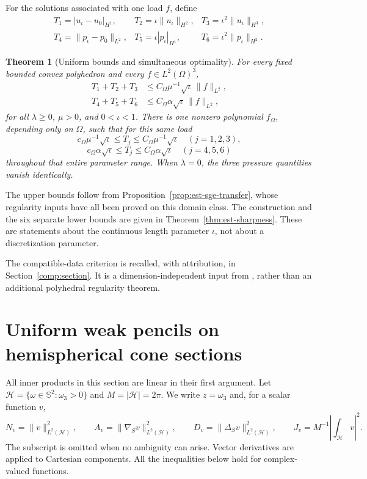 \documentclass[11pt,a4paper]{article}
\newtheorem{theorem}{Theorem}[section]
\theoremstyle{remark}
\numberwithin{equation}{section}
\begin{document}
For the solutions associated with one load \(f\), define
\[
 \begin{array}{lll}
 T_1=|u_\iota-u_0|_{H^1},&
 T_2=\iota\|u_\iota\|_{H^2},&
 T_3=\iota^2\|u_\iota\|_{H^3},\\
 T_4=\|p_\iota-p_0\|_{L^2},&
 T_5=\iota|p_\iota|_{H^1},&
 T_6=\iota^2\|p_\iota\|_{H^2}.
 \end{array}
\]
\begin{theorem}[Uniform bounds and simultaneous optimality]
\label{thm:main-sharp}
For every fixed bounded convex polyhedron and every \(f\in L^2(\Omega)^3\),
\begin{align}
 T_1+T_2+T_3&\le C_\Omega\mu^{-1}\sqrt{\iota}\,\|f\|_{L^2},
 \label{eq:main-u}\\
 T_4+T_5+T_6&\le C_\Omega\alpha\sqrt{\iota}\,\|f\|_{L^2},
 \label{eq:main-p}
\end{align}
for all \(\lambda\ge0\), \(\mu>0\), and \(0<\iota<1\).
There is one nonzero polynomial \(f_\Omega\), depending only on \(\Omega\),
such that for this same load
\[
 c_\Omega\mu^{-1}\sqrt{\iota}\le T_j
       \le C_\Omega\mu^{-1}\sqrt{\iota}\quad(j=1,2,3),
\]
\[
 c_\Omega\alpha\sqrt{\iota}\le T_j
       \le C_\Omega\alpha\sqrt{\iota}\quad(j=4,5,6)
\]
throughout that entire parameter range.
When \(\lambda=0\), the three pressure quantities vanish identically.
\end{theorem}

The upper bounds follow from Proposition~\ref{prop:est-sge-transfer},
whose regularity inputs have all been proved on this domain class.
The construction and the six separate lower bounds are given in
Theorem~\ref{thm:est-sharpness}.
These are statements about the continuous length parameter \(\iota\),
not about a discretization parameter.

The compatible-data criterion is recalled, with attribution, in
Section~\ref{comp:section}. It is a dimension-independent input from
\cite{PolygonCompanion2026}, rather than an additional polyhedral
regularity theorem.

\section{Uniform weak pencils on hemispherical cone sections}
\label{sec:hemispherical-pencil}

All inner products in this section are linear in their first argument.
Let $\mathcal H=\{\omega\in\mathbb S^2:\omega_3>0\}$ and
$M=|\mathcal H|=2\pi$. We write $z=\omega_3$ and, for a scalar function $v$,
\[
 N_v=\|v\|_{L^2(\mathcal H)}^2,\qquad
 A_v=\|\nabla_Sv\|_{L^2(\mathcal H)}^2,\qquad
 D_v=\|\Delta_Sv\|_{L^2(\mathcal H)}^2,\qquad
 J_v=M^{-1}\left|\int_{\mathcal H}v\right|^2.
\]
The subscript is omitted when no ambiguity can arise. Vector derivatives
are applied to Cartesian components. All the inequalities below hold for
complex-valued functions.
\end{document}
